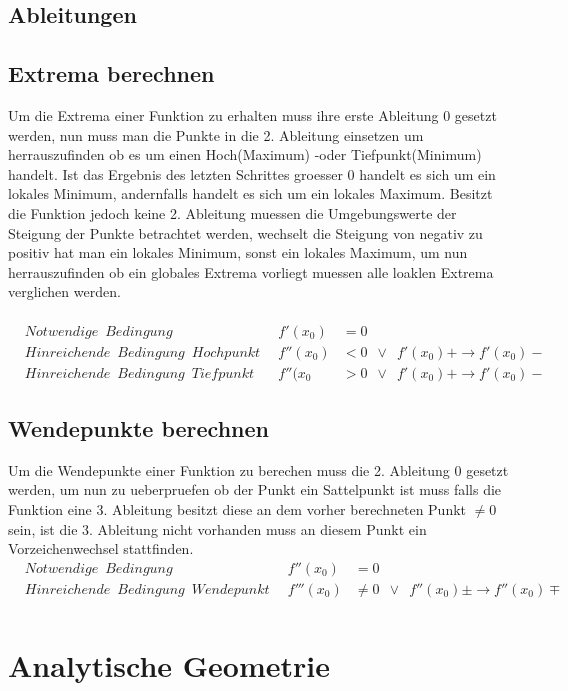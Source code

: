 \documentclass[a4paper]{article} %
\begin{document}
	\subsection{Ableitungen}
	\subsection{Extrema berechnen}
	Um die Extrema einer Funktion zu erhalten muss ihre erste Ableitung $0$ gesetzt werden, nun muss man die Punkte in die 2. Ableitung
	einsetzen um herrauszufinden ob es um einen Hoch(Maximum) -oder Tiefpunkt(Minimum) handelt. Ist das Ergebnis des letzten Schrittes groesser 0
	handelt es sich um ein lokales Minimum, andernfalls handelt es sich um ein lokales Maximum. Besitzt die Funktion jedoch keine 2. Ableitung muessen die Umgebungswerte der Steigung der Punkte betrachtet werden, wechselt die Steigung von negativ zu positiv hat man ein lokales  Minimum, sonst ein lokales Maximum, um nun herrauszufinden ob ein globales Extrema vorliegt muessen alle loaklen Extrema verglichen werden.\\\\
	\begin{align*}
		&Notwendige\enspace Bedingung\enspace &f'(x_0)&=0\\
		&Hinreichende\enspace Bedingung\enspace Hochpunkt\enspace &f''(x_0)&<0\enspace \lor \enspace f'(x_0)+\rightarrow f'(x_0)- \\
		&Hinreichende\enspace Bedingung\enspace Tiefpunkt\enspace &f''(x_0&>0\enspace \lor \enspace f'(x_0)+\rightarrow f'(x_0)-
	\end{align*}
	\subsection{Wendepunkte berechnen}
	Um die Wendepunkte einer Funktion zu berechen muss die 2. Ableitung 0 gesetzt werden, um nun zu ueberpruefen ob der Punkt ein Sattelpunkt ist muss falls die Funktion eine 3. Ableitung besitzt diese an dem vorher berechneten Punkt $\neq 0$ sein, ist die 3. Ableitung nicht vorhanden muss an diesem Punkt ein Vorzeichenwechsel stattfinden.
	\begin{align*}
		&Notwendige\enspace Bedingung\enspace &f''(x_0)&=0\\
		&Hinreichende\enspace Bedingung\enspace Wendepunkt\enspace &f'''(x_0)& \neq 0\enspace \lor \enspace f''(x_0)\pm\rightarrow f''(x_0)\mp \\
	\end{align*}
	\pagebreak
	\section{Analytische Geometrie}
\end{document}
